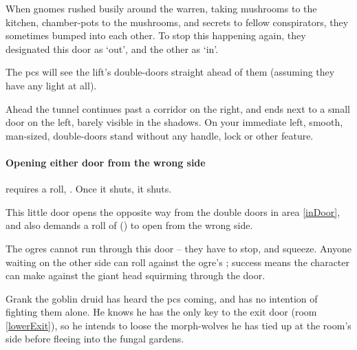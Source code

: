 
\begin{exampletext}
  When gnomes rushed busily around the \gls{warren}, taking mushrooms to the kitchen, chamber-pots to the mushrooms, and secrets to fellow conspirators, they sometimes bumped into each other.
  To stop this happening again, they designated this door as `out', and the other as `in'.
\end{exampletext}

The \glspl{pc} will see the lift's double-doors straight ahead of them (assuming they have any light at all).

\begin{boxtext}
  Ahead the tunnel continues past a corridor on the right, and ends next to a small door on the left, barely visible in the shadows.
  On your immediate left, smooth, man-sized, double-doors stand without any handle, lock or other feature.
\end{boxtext}

\paragraph{Opening either door from the wrong side}
requires a  roll, \tn[10].
Once it shuts, it shuts.


This little door opens the opposite way from the double doors in area \ref{inDoor}, and also demands a roll of  (\tn[10]) to open from the wrong side.

The \glspl{ogre} cannot run through this door -- they have to stop, and squeeze.
Anyone waiting on the other side can roll  against the ogre's ; success means the character can make  against the giant head squirming through the door.%



Grank the goblin druid has heard the \glspl{pc} coming, and has no intention of fighting them alone.
He knows he has the only key to the exit door (room \vref{lowerExit}), so he intends to loose the morph-wolves he has tied up at the room's side before fleeing into the fungal gardens.

